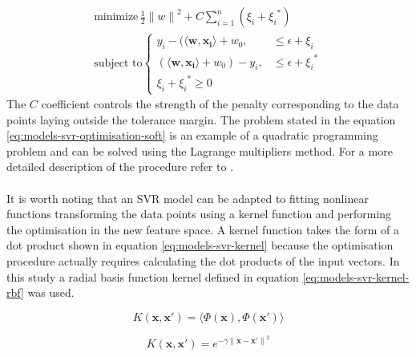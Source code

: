 \begin{equation}\label{eq:models-svr-optimisation-soft}
\begin{gathered}
    \text{minimize}\, \frac{1}{2} {\lVert {w} \rVert}^2 + C\sum_{i = 1}^{n} ({\xi}_i + {{\xi}_i}^*) \\
    \text{subject to}
    \begin{cases}
        y_i - (\langle \bm{w}, \bm{x_i} \rangle + w_0, & \leq \epsilon + {\xi}_i \\
        (\langle \bm{w}, \bm{x_i} \rangle + w_0) - y_i, & \leq \epsilon + {{\xi}_i}^* \\
        {\xi}_i + {{\xi}_i}^* \geq 0
    \end{cases}
\end{gathered}
\end{equation}
The $C$ coefficient controls the strength of the penalty corresponding to the data points laying outside the tolerance margin. The problem stated in the equation \ref{eq:models-svr-optimisation-soft} is an example of a quadratic programming problem and can be solved using the Lagrange multipliers method. For a more detailed description of the procedure refer to \cite{SMOLA2003}.
\\\\
It is worth noting that an SVR model can be adapted to fitting nonlinear functions transforming the data points using a kernel function and performing the optimisation in the new feature space. A kernel function takes the form of a dot product shown in equation \ref{eq:models-svr-kernel} because the optimisation procedure actually requires calculating the dot products of the input vectors. In this study a radial basis function kernel defined in equation \ref{eq:models-svr-kernel-rbf} was used.

\begin{equation}\label{eq:models-svr-kernel}
K(\bm{x}, \bm{x'}) = \langle \Phi(\bm{x}), \Phi(\bm{x'}) \rangle
\end{equation}

\begin{equation}\label{eq:models-svr-kernel-rbf}
K(\bm{x}, \bm{x'}) = e^{-\gamma {\lVert \bm{x} - \bm{x'} \rVert}^2}
\end{equation}

